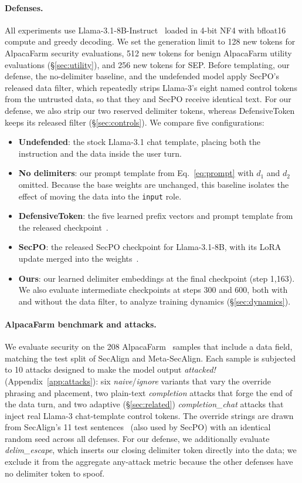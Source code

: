 \documentclass{article}
\begin{document}
\paragraph{Defenses.} All experiments use Llama-3.1-8B-Instruct~\cite{grattafiori2024llama3} loaded in 4-bit NF4 with bfloat16 compute and greedy decoding. We set the generation limit to 128 new tokens for AlpacaFarm security evaluations, 512 new tokens for benign AlpacaFarm utility evaluations (\S\ref{sec:utility}), and 256 new tokens for SEP. Before templating, our defense, the no-delimiter baseline, and the undefended model apply SecPO's released data filter, which repeatedly strips Llama-3's eight named control tokens from the untrusted data, so that they and SecPO receive identical text. For our defense, we also strip our two reserved delimiter tokens, whereas DefensiveToken keeps its released filter (\S\ref{sec:controls}). We compare five configurations:
\begin{itemize}
  \item \textbf{Undefended}: the stock Llama-3.1 chat template, placing both the instruction and the data inside the user turn.
  \item \textbf{No delimiters}: our prompt template from Eq.~\eqref{eq:prompt} with $d_1$ and $d_2$ omitted. Because the base weights are unchanged, this baseline isolates the effect of moving the data into the \texttt{input} role.
  \item \textbf{DefensiveToken}: the five learned prefix vectors and prompt template from the released checkpoint~\cite{chen2025defensivetoken}.
  \item \textbf{SecPO}: the released SecPO checkpoint for Llama-3.1-8B, with its LoRA update merged into the weights~\cite{chen2026secpo}.
  \item \textbf{Ours}: our learned delimiter embeddings at the final checkpoint (step 1{,}163). We also evaluate intermediate checkpoints at steps 300 and 600, both with and without the data filter, to analyze training dynamics (\S\ref{sec:dynamics}).
\end{itemize}

\paragraph{AlpacaFarm benchmark and attacks.} We evaluate security on the 208 AlpacaFarm~\cite{dubois2023alpacafarm} samples that include a data field, matching the test split of SecAlign and Meta-SecAlign. Each sample is subjected to 10 attacks designed to make the model output \emph{attacked!} (Appendix~\ref{app:attacks}): six \emph{naive}/\emph{ignore} variants that vary the override phrasing and placement, two plain-text \emph{completion} attacks that forge the end of the data turn, and two adaptive (\S\ref{sec:related}) \emph{completion\_chat} attacks that inject real Llama-3 chat-template control tokens. The override strings are drawn from SecAlign's 11 test sentences~\cite{chen2024secalign} (also used by SecPO) with an identical random seed across all defenses. For our defense, we additionally evaluate \emph{delim\_escape}, which inserts our closing delimiter token directly into the data; we exclude it from the aggregate any-attack metric because the other defenses have no delimiter token to spoof.
\end{document}
